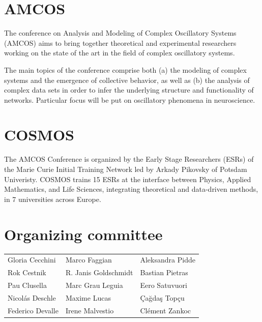 \documentclass[
	openany, %
	parskip=full, %
	12pt, %
	a4paper, %
]{conferencebooklet} %
\begin{document}
\section{AMCOS}

The conference on Analysis and Modeling of Complex Oscillatory Systems (AMCOS) aims to bring together theoretical and experimental researchers working on the state of the art in the field of complex oscillatory systems.

The main topics of the conference comprise both (a) the modeling of complex systems and the emergence of collective behavior, as well as (b) the analysis of complex data sets in order to infer the underlying structure and functionality of networks. Particular focus will be put on oscillatory phenomena in neuroscience.

\section{COSMOS}

The AMCOS Conference is organized by the Early Stage Researchers (ESRs) of the Marie Curie Initial Training Network led by Arkady Pikovsky of Potsdam Univeristy. COSMOS trains 15 ESRs at the interface between Physics, Applied Mathematics, and Life Sciences, integrating theoretical and data-driven methods, in 7 universities across Europe.

\section{Organizing committee}

\begin{center}
	\begin{tabular}{l l l}
		Gloria Cecchini & Marco Faggian &  Aleksandra Pidde \\
		Rok Cestnik & R. Janis Goldschmidt &  Bastian Pietras\\
		 Pau Clusella  & Marc Grau Leguia & Eero Satuvuori \\
		 Nicolás Deschle & Maxime Lucas   &  Çağdaş Topçu \\
		Federico Devalle  & Irene Malvestio  & Clément Zankoc
	\end{tabular}
\end{center}

\end{document}
